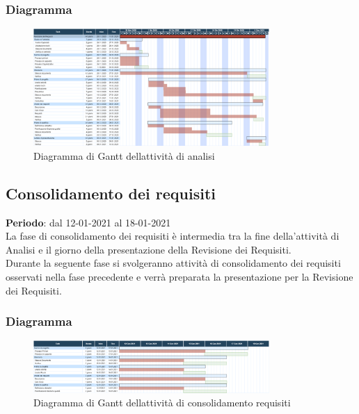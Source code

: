 	\subsubsection{Diagramma}
		\begin{figure}[H]
        		\centering
        		\includegraphics[width=0.8\textwidth]{source/img/analisiattivita.png}
        		\caption{Diagramma di Gantt dell\textquotesingle attività di analisi}
    		\end{figure}

	\subsection{Consolidamento dei requisiti}
	\textbf{Periodo}: dal 12-01-2021 al 18-01-2021 \\
	La fase di consolidamento dei requisiti è intermedia tra la fine della'attività di Analisi e il giorno della presentazione della Revisione dei Requisiti. \\
	Durante la seguente fase si svolgeranno attività di consolidamento dei requisiti osservati nella fase precedente e verrà preparata la presentazione per la Revisione dei Requisiti.
	
	\subsubsection{Diagramma}
		\begin{figure}[H]
        		\centering
        		\includegraphics[width=0.8\textwidth]{source/img/Consolidamento_Requisiti.png}
        		\caption{Diagramma di Gantt dell\textquotesingle attività di consolidamento requisiti}
    		\end{figure}
	
